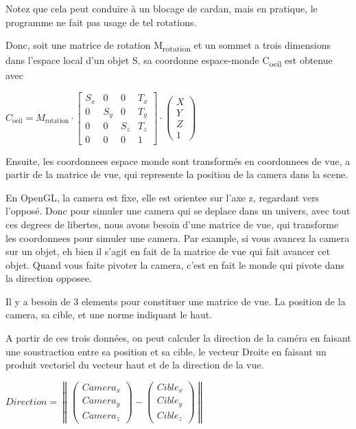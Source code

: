\documentclass[11pt, a4paper, titlepage]{article}
\begin{document}
Notez que cela peut conduire à un blocage de cardan, mais en pratique,
le programme ne fait pas usage de tel rotations.

Donc, soit une matrice de rotation M\textsubscript{rotation} et un
sommet a trois dimensions dans l'espace local d'un objet S, sa
coordonne espace-monde C\textsubscript{oeil} est obtenue avec

\begin{math}
  C_\text{oeil} = M_\text{rotation} \cdot
  \begin{bmatrix}
    S_x & 0   & 0   & T_x \\
    0   & S_y & 0   & T_y \\
    0   & 0   & S_z & T_z \\
    0 & 0 & 0 & 1
  \end{bmatrix}
  \cdot
  \begin{pmatrix}
    X \\
    Y \\
    Z \\
    1
  \end{pmatrix}
\end{math}

Ensuite, les coordonnees espace monde sont transformés en coordonnees
de vue, a partir de la matrice de vue, qui represente la position de
la camera dans la scene.

En OpenGL, la camera est fixe, elle est orientee sur l'axe z,
regardant vers l'opposé. Donc pour simuler une camera qui se deplace
dans un univers, avec tout ces degrees de libertes, nous avons besoin
d'une matrice de vue, qui transforme les coordonnees pour simuler une
camera.  Par example, si vous avancez la camera sur un objet, eh bien
il s'agit en fait de la matrice de vue qui fait avancer cet objet.
Quand vous faite pivoter la camera, c'est en fait le monde qui pivote
dans la direction opposee.

Il y a besoin de 3 elements pour constituer une matrice de vue.  La
position de la camera, sa cible, et une norme indiquant le haut.

A partir de ces trois données, on peut calculer la direction de la
caméra en faisant une soustraction entre sa position et sa cible, le
vecteur Droite en faisant un produit vectoriel du vecteur haut et de
la direction de la vue.

\begin{math}
  Direction = \left\|
    \begin{pmatrix}
      Camera_x \\
      Camera_y \\
      Camera_z
    \end{pmatrix}
    -
    \begin{pmatrix}
      Cible_x \\
      Cible_y \\
      Cible_z
    \end{pmatrix}
  \right\|
\end{math}
\end{document}
